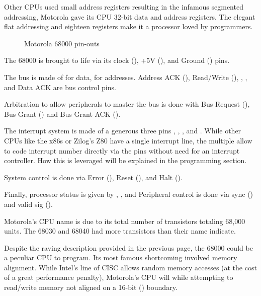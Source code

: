 Other CPUs used small address registers resulting in the infamous segmented addressing, Motorola gave its CPU 32-bit data and address registers. The elegant flat addressing and eighteen registers make it a processor loved by programmers. 


\begin{figure}[H]

 
 \caption*{Motorola 68000 pin-outs}
\label{68000drawing}
  \end{figure}



The 68000 is brought to life via its clock (), +5V (), and Ground () pins.

The bus is made of  for data, \icode{A1-A23]} for addresses. Address ACK (), Read/Write (), , , and Data ACK  are bus control pins.


Arbitration to allow peripherals to master the bus is done with Bus Request (),  Bus Grant () and Bus Grant ACK ().

The interrupt system is made of a generous three pins , , , and . While other CPUs like the x86s or Zilog's Z80 have a single interrupt line, the multiple  allow to code interrupt number directly via the pins without need for an interrupt controller. How this is leveraged will be explained in the programming section.


System control is done via Error (), Reset (), and Halt (). 

Finally, processor status is given by , ,  and Peripheral control is done via sync () and valid sig ().

\begin{trivia}
Motorola's CPU name is due to its total number of transistors totaling 68,000 units. The 68030 and 68040 had more transistors than their name indicate. 
\end{trivia}

Despite the raving description provided in the previous page, the 68000 could be a peculiar CPU to program. Its most famous shortcoming involved memory alignment. While Intel's line of CISC allows random memory accesses (at the cost of a great performance penalty), Motorola's CPU will  while attempting to read/write memory not aligned on a 16-bit () boundary.

